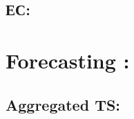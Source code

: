 \documentclass[c, dvipsnames]{beamer}  %
\begin{document}
\subsection{ЕС:} 

%
%
%
%
%
%
%
%
%
%

%
\section{Forecasting :} 

\subsection{Aggregated TS:} 

%
%
%
%
%
%
%
%
%
%



%
%
%
%
%
%
%
%
%
%
%
%
%
%
%
%
%
\end{document}

